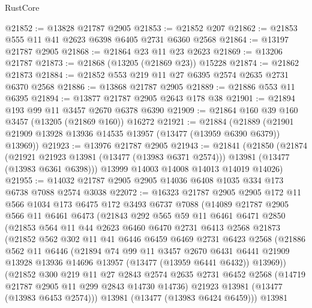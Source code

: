 \begin{lexlean}{RustCore}
\begin{coremodule}
@21852 := @13828 @21787 @2905
@21853 := @21852 @207
@21862 := @21853 @555 @11 @41 @2623 @6398 @6405 @2731 @6360 @2568
@21864 := @13197 @21787 @2905
@21868 := @21864 @23 @11 @23 @2623
@21869 := @13206 @21787
@21873 := @21868 (@13205 (@21869 @23)) @15228
@21874 := @21862 @21873
@21884 := @21852 @553 @219 @11 @27 @6395 @2574 @2635 @2731 @6370 @2568
@21886 := @13868 @21787 @2905
@21889 := @21886 @553 @11 @6395
@21894 := @13877 @21787 @2905 @2643 @178 @38
@21901 := @21894 @193 @99 @11 @3457 @2670 @6378 @6390
@21909 := @21864 @160 @39 @160 @3457 (@13205 (@21869 @160)) @16272
@21921 := @21884
    (@21889 (@21901 @21909 @13928 @13936 @14535 @13957 (@13477 (@13959 @6390 @6379)) @13969))
@21923 := @13976 @21787 @2905
@21943 := @21841
    (@21850
      (@21874
        (@21921 @21923 @13981 (@13477 (@13983 @6371 @2574)))
        @13981
        (@13477 (@13983 @6361 @6398)))
      @13999
      @14003
      @14008
      @14013
      @14019
      @14026)
@21955 := @14032 @21787 @2905 @2905 @14036 @6408 @1035 @334 @173 @6738 @7088 @2574 @3038
@22072 := @16323
    @21787
    @2905
    @2905
    @172
    @11
    @566
    @1034
    @173
    @6475
    @172
    @3493
    @6737
    @7088
    (@14089
      @21787
      @2905
      @566
      @11
      @6461
      @6473
      (@21843
        @292
        @565
        @59
        @11
        @6461
        @6471
        @2850
        (@21853
          @564
          @11
          @44
          @2623
          @6460
          @6470
          @2731
          @6413
          @2568
          @21873
          (@21852
            @562
            @302
            @11
            @41
            @6446
            @6459
            @6469
            @2731
            @6423
            @2568
            (@21886
              @562
              @11
              @6446
              (@21894
                @74
                @99
                @11
                @3457
                @2670
                @6431
                @6441
                @21909
                @13928
                @13936
                @14696
                @13957
                (@13477 (@13959 @6441 @6432))
                @13969))
            (@21852
              @300
              @219
              @11
              @27
              @2843
              @2574
              @2635
              @2731
              @6452
              @2568
              (@14719 @21787 @2905 @11 @299 @2843 @14730 @14736)
              @21923
              @13981
              (@13477 (@13983 @6453 @2574)))
            @13981
            (@13477 (@13983 @6424 @6459)))
          @13981

\end{coremodule}
\end{lexlean}
